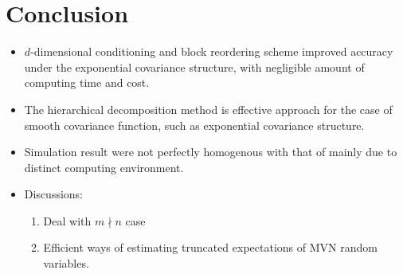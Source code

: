 \section{Conclusion}

\begin{frame}{\secname}

    \begin{itemize}
        \item $d$-dimensional conditioning and block reordering scheme improved accuracy under the exponential covariance structure, with negligible amount of computing time and cost.
        \item The hierarchical decomposition method is effective approach for the case of smooth covariance function, such as exponential covariance structure.
        \item Simulation result were not perfectly homogenous with that of \citet{cao2019hierarchical} mainly due to distinct computing environment.
        \item Discussions:
            \begin{enumerate}
                \item Deal with $m \nmid n$ case 
                \item Efficient ways of estimating truncated expectations of MVN random variables.
            \end{enumerate}
    \end{itemize}
    
\end{frame}

